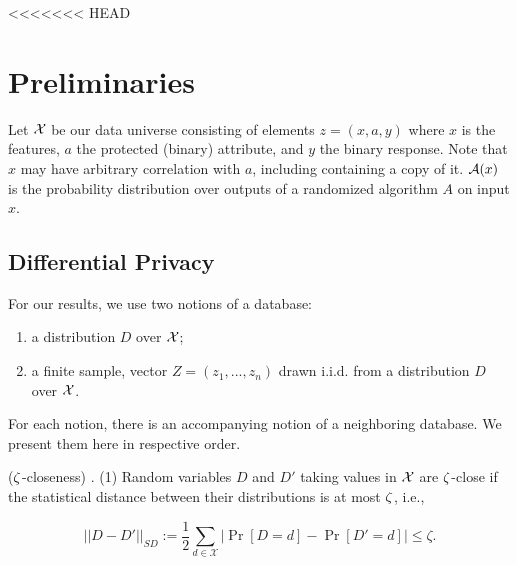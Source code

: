 <<<<<<< HEAD

\section{Preliminaries}
Let $\mathcal{X}$ be our data universe consisting of elements $z=(x,a,y)$
 where $x$ is the features, $a$ the protected (binary) attribute, and
 $y$ the binary response. Note that $x$ may have arbitrary correlation
 with $a$, including containing a copy of it. $\mathcal{A}(x)$ is the
 probability distribution over outputs of a randomized algorithm $A$ on
 input $x$.





\subsection{Differential Privacy}

For our results, we use two notions of a database:

\begin{enumerate}
	\item a distribution $D$ over $\mathcal{X}$;
	\item a finite sample, vector $Z = (z_1, ..., z_n)$ drawn i.i.d. from a distribution $D$ over $\mathcal{X}$.
\end{enumerate}
For each notion, there is an accompanying notion of a neighboring
database. We present them here in respective order.

\begin{defn}
  ($\zeta$-closeness) \cite{2dplimits}. (1) Random variables $D$ and $D'$ taking values in
  $\mathcal{X}$ are $\zeta$-close if the statistical distance between their
  distributions is at most $\zeta$, i.e.,

	$$ ||D-D'||_{\textit{SD}} :=\frac{1}{2}\sum_{d\in \mathcal{X}}
  |\Pr[D=d] - \Pr[D'=d]| \leq \zeta.$$
\end{defn}

